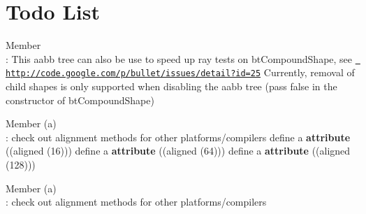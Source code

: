 \chapter{Todo List}
\hypertarget{todo}{}\label{todo}

\begin{DoxyRefList}
\item[Member \doxylink{bt_compound_shape_8h_add6c56fdc8faf75882f54e99836ba306}{\+\_\+\+\_\+pad0\+\_\+\+\_\+} ]\hfill \\
\label{todo__todo000021}%
%
\+: This aabb tree can also be use to speed up ray tests on bt\+Compound\+Shape, see \href{http://code.google.com/p/bullet/issues/detail?id=25}{\texttt{ http\+://code.\+google.\+com/p/bullet/issues/detail?id=25}} Currently, removal of child shapes is only supported when disabling the aabb tree (pass \textquotesingle{}false\textquotesingle{} in the constructor of bt\+Compound\+Shape)  
\item[Member \doxylink{bt_scalar_8h_a38c30fdd0ea2558373a1b6e41c77d9d2}{ATTRIBUTE\+\_\+\+ALIGNED16} (a)]\hfill \\
\label{todo__todo000044}%
%
\+: check out alignment methods for other platforms/compilers define  a {\bfseries{attribute}} ((aligned (16))) define  a {\bfseries{attribute}} ((aligned (64))) define  a {\bfseries{attribute}} ((aligned (128)))  
\item[Member \doxylink{b3_scalar_8h_ac5e6b050aeb4ddfacbc6f7c4ac541a7d}{B3\+\_\+\+ATTRIBUTE\+\_\+\+ALIGNED16} (a)]\hfill \\
\label{todo__todo000004}%
%
\+: check out alignment methods for other platforms/compilers  
\item[Member \doxylink{classb3_pgs_jacobi_solver_a77bbf900d267d24d3cf8363f9b690736}{b3\+Pgs\+Jacobi\+Solver\+::solve\+Group\+Cache\+Friendly\+Setup} (\doxylink{structb3_rigid_body_data}{b3\+Rigid\+Body\+Data} \texorpdfstring{$\ast$}{*}bodies, \doxylink{structb3_inertia_data}{b3\+Inertia\+Data} \texorpdfstring{$\ast$}{*}inertias, int num\+Bodies, b3\+Contact4 \texorpdfstring{$\ast$}{*}manifold\+Ptr, int num\+Manifolds, b3\+Typed\+Constraint \texorpdfstring{$\ast$}{*}\texorpdfstring{$\ast$}{*}constraints, int num\+Constraints, const \doxylink{structb3_contact_solver_info}{b3\+Contact\+Solver\+Info} \&info\+Global)]\hfill \\

\end{DoxyRefList}
